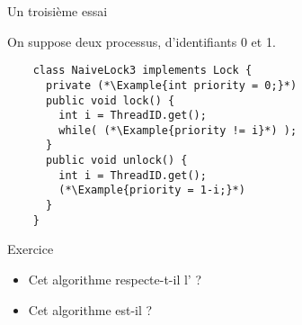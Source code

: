 
\begingroup

\begin{frame}[fragile]{Un troisième essai}

  On suppose deux processus, d'identifiants 0 et 1. 

  \begin{lstlisting}
    class NaiveLock3 implements Lock {
      private (*\Example{int priority = 0;}*)
      public void lock() {
        int i = ThreadID.get();
        while( (*\Example{priority != i}*) );
      }
      public void unlock() {
        int i = ThreadID.get();
        (*\Example{priority = 1-i;}*)
      }
    }
  \end{lstlisting}

  \begin{exampleblock}{Exercice}
    \begin{itemize}
    \item Cet algorithme respecte-t-il l' ?
    \item Cet algorithme est-il  ?
    \end{itemize}
  \end{exampleblock}

\end{frame}

\endgroup
\endinput
